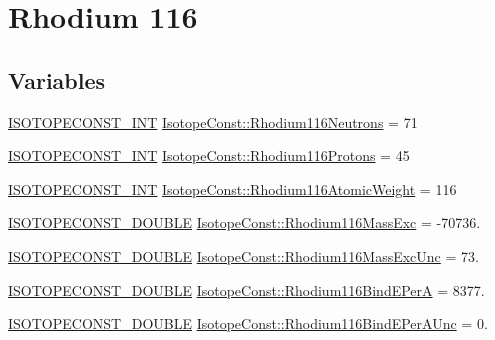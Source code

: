 \hypertarget{group___isotope_const-_rhodium-_rh116}{}\section{Rhodium 116}
\label{group___isotope_const-_rhodium-_rh116}
\subsection*{Variables}
\begin{DoxyCompactItemize}
\item 
\mbox{\hyperlink{group___isotope_const-_macros_ga5f18360b3e99483a35c32d789e62621c}{I\+S\+O\+T\+O\+P\+E\+C\+O\+N\+S\+T\+\_\+\+I\+NT}} \mbox{\hyperlink{group___isotope_const-_rhodium-_rh116_ga1b0c37d35e3c877b98798c14b5890098}{Isotope\+Const\+::\+Rhodium116\+Neutrons}} = 71
\item 
\mbox{\hyperlink{group___isotope_const-_macros_ga5f18360b3e99483a35c32d789e62621c}{I\+S\+O\+T\+O\+P\+E\+C\+O\+N\+S\+T\+\_\+\+I\+NT}} \mbox{\hyperlink{group___isotope_const-_rhodium-_rh116_gae0e5f274eb43652999f054fe4b2dc129}{Isotope\+Const\+::\+Rhodium116\+Protons}} = 45
\item 
\mbox{\hyperlink{group___isotope_const-_macros_ga5f18360b3e99483a35c32d789e62621c}{I\+S\+O\+T\+O\+P\+E\+C\+O\+N\+S\+T\+\_\+\+I\+NT}} \mbox{\hyperlink{group___isotope_const-_rhodium-_rh116_ga3c9d9ce032c5f3a81963d1c0a997f79f}{Isotope\+Const\+::\+Rhodium116\+Atomic\+Weight}} = 116
\item 
\mbox{\hyperlink{group___isotope_const-_macros_ga8f45a7272ce02c0b4c65c44636ed719a}{I\+S\+O\+T\+O\+P\+E\+C\+O\+N\+S\+T\+\_\+\+D\+O\+U\+B\+LE}} \mbox{\hyperlink{group___isotope_const-_rhodium-_rh116_ga5a13323d5212973273c905632df6578c}{Isotope\+Const\+::\+Rhodium116\+Mass\+Exc}} = -\/70736.
\item 
\mbox{\hyperlink{group___isotope_const-_macros_ga8f45a7272ce02c0b4c65c44636ed719a}{I\+S\+O\+T\+O\+P\+E\+C\+O\+N\+S\+T\+\_\+\+D\+O\+U\+B\+LE}} \mbox{\hyperlink{group___isotope_const-_rhodium-_rh116_ga0837a4920b1e754181035a74e725055c}{Isotope\+Const\+::\+Rhodium116\+Mass\+Exc\+Unc}} = 73.
\item 
\mbox{\hyperlink{group___isotope_const-_macros_ga8f45a7272ce02c0b4c65c44636ed719a}{I\+S\+O\+T\+O\+P\+E\+C\+O\+N\+S\+T\+\_\+\+D\+O\+U\+B\+LE}} \mbox{\hyperlink{group___isotope_const-_rhodium-_rh116_ga719ca0c20cee7cc3219bfe1ad2207693}{Isotope\+Const\+::\+Rhodium116\+Bind\+E\+PerA}} = 8377.
\item 
\mbox{\hyperlink{group___isotope_const-_macros_ga8f45a7272ce02c0b4c65c44636ed719a}{I\+S\+O\+T\+O\+P\+E\+C\+O\+N\+S\+T\+\_\+\+D\+O\+U\+B\+LE}} \mbox{\hyperlink{group___isotope_const-_rhodium-_rh116_ga1dcc3b38765f6f3431eee76b75fd64fb}{Isotope\+Const\+::\+Rhodium116\+Bind\+E\+Per\+A\+Unc}} = 0.

\end{DoxyCompactItemize}
